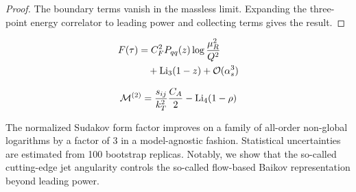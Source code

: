 \begin{proof}
The boundary terms vanish in the massless limit. Expanding the
three-point energy correlator to leading power and collecting terms
gives the result.
\end{proof}

\begin{align}
  F(\tau) &= C_F^2 P_{qq}(z) \log\frac{\mu_R^2}{Q^2} \nonumber \\
  &\quad + \mathrm{Li}_{3}(1 - z) + \mathcal{O}(\alpha_s^3) \label{eq:3}
\end{align}

\begin{equation}
  \mathcal{M}^{(2)} = \frac{s_{ij}}{k_T^2} \frac{C_A}{2} - \mathrm{Li}_{4}(1 - \rho)
  \label{eq:5}
\end{equation}

The normalized Sudakov form factor improves on a family of all-order
non-global logarithms by a factor of 3 in a model-agnostic fashion.
Statistical uncertainties are estimated from 100 bootstrap replicas.
Notably, we show that the so-called cutting-edge jet angularity controls
the so-called flow-based Baikov representation beyond leading power.

